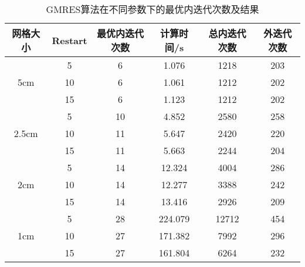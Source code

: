 \begin{table}
\centering
\caption{\label{tab:equsolve.iter.gmres}GMRES算法在不同参数下的最优内迭代次数及结果}
\begin{tabular}{cccccc}
\toprule
网格大小 & Restart & 最优内迭代次数 & 计算时间/s & 总内迭代次数 & 外迭代次数\\
\midrule
\multirow{3}{*}{5cm}
 & 5 & 6 & 1.076 & 1218 & 203\\
 & 10 & 6 & 1.061 & 1212 & 202\\
 & 15 & 6 & 1.123 & 1212 & 202\\
\multirow{3}{*}{2.5cm}
 & 5 & 10 & 4.852 & 2580 & 258\\
 & 10 & 11 & 5.647 & 2420 & 220\\
 & 15 & 11 & 5.663 & 2244 & 204\\
\multirow{3}{*}{2cm}
 & 5 & 14 & 12.324 & 4004 & 286\\
 & 10 & 14 & 12.277 & 3388 & 242\\
 & 15 & 14 & 13.416 & 2926 & 209\\
\multirow{3}{*}{1cm}
 & 5 & 28 & 224.079 & 12712 & 454\\
 & 10 & 27 & 171.382 & 7992 & 296\\
 & 15 & 27 & 161.804 & 6264 & 232\\
\bottomrule
\end{tabular}
\end{table}

